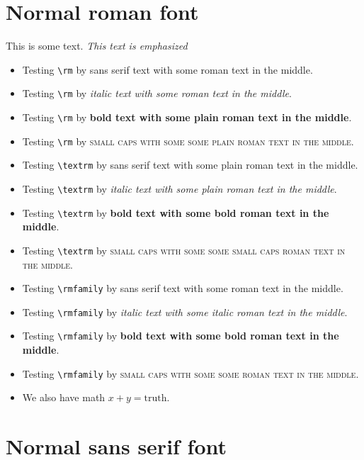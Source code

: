 \documentclass{article}
\begin{document}
\section{Normal roman font}

This is some text.  \emph{This text is emphasized}
\begin{itemize}
\item
Testing \verb#\rm# by \textsf{sans serif text with {\rm some roman text} in the middle}.
\item
Testing \verb#\rm# by \textit{italic text with {\rm some roman text} in the middle}.
\item
Testing \verb#\rm# by \textbf{bold text with {\rm some plain roman text} in the middle}.
\item
Testing \verb#\rm# by \textsc{small caps with some {\rm some plain roman text} in the middle}.
\item
Testing \verb#\textrm# by \textsf{sans serif text with \textrm{some plain roman text} in the middle}.
\item
Testing \verb#\textrm# by \textit{italic text with \textrm{some plain roman text} in the middle}.
\item
Testing \verb#\textrm# by \textbf{bold text with \textrm{some bold roman text} in the middle}.
\item
Testing \verb#\textrm# by \textsc{small caps with some \textrm{some small caps roman text} in the middle}.
\item
Testing \verb#\rmfamily# by \textsf{sans serif text with {\rmfamily some roman text} in the middle}.
\item
Testing \verb#\rmfamily# by \textit{italic text with {\rmfamily some italic roman text} in the middle}.
\item
Testing \verb#\rmfamily# by \textbf{bold text with {\rmfamily some bold roman text} in the middle}.
\item
Testing \verb#\rmfamily# by \textsc{small caps with some {\rmfamily some roman text} in the middle}.
\item
We also have math $x+y = \mathrm{truth}$.
\end{itemize}

\section{Normal sans serif font}
\end{document}

